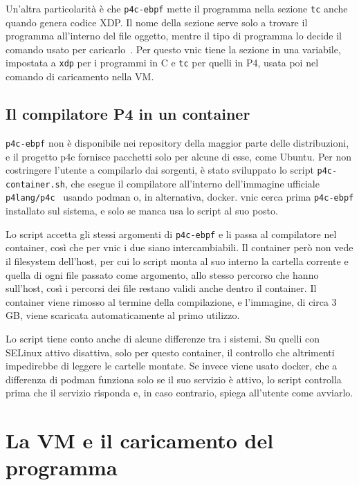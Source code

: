 Un'altra particolarità è che \texttt{p4c-ebpf} mette il programma nella sezione \texttt{tc} anche quando genera codice XDP. Il nome della sezione serve solo a trovare il programma all'interno del file oggetto, mentre il tipo di programma lo decide il comando usato per caricarlo~\cite{cilium-bpf}. Per questo vnic tiene la sezione in una variabile, impostata a \texttt{xdp} per i programmi in C e \texttt{tc} per quelli in P4, usata poi nel comando di caricamento nella VM.

\subsection{Il compilatore P4 in un container}

\texttt{p4c-ebpf} non è disponibile nei repository della maggior parte delle distribuzioni, e il progetto p4c fornisce pacchetti solo per alcune di esse, come Ubuntu. Per non costringere l'utente a compilarlo dai sorgenti, è stato sviluppato lo script \texttt{p4c-container.sh}, che esegue il compilatore all'interno dell'immagine ufficiale \texttt{p4lang/p4c}~\cite{p4c-docker} usando podman o, in alternativa, docker. vnic cerca prima \texttt{p4c-ebpf} installato sul sistema, e solo se manca usa lo script al suo posto.

Lo script accetta gli stessi argomenti di \texttt{p4c-ebpf} e li passa al compilatore nel container, così che per vnic i due siano intercambiabili. Il container però non vede il filesystem dell'host, per cui lo script monta al suo interno la cartella corrente e quella di ogni file passato come argomento, allo stesso percorso che hanno sull'host, così i percorsi dei file restano validi anche dentro il container. Il container viene rimosso al termine della compilazione, e l'immagine, di circa 3\,GB, viene scaricata automaticamente al primo utilizzo.

Lo script tiene conto anche di alcune differenze tra i sistemi. Su quelli con SELinux attivo disattiva, solo per questo container, il controllo che altrimenti impedirebbe di leggere le cartelle montate. Se invece viene usato docker, che a differenza di podman funziona solo se il suo servizio è attivo, lo script controlla prima che il servizio risponda e, in caso contrario, spiega all'utente come avviarlo.

\section{La VM e il caricamento del programma}\label{sec:config-vm}

